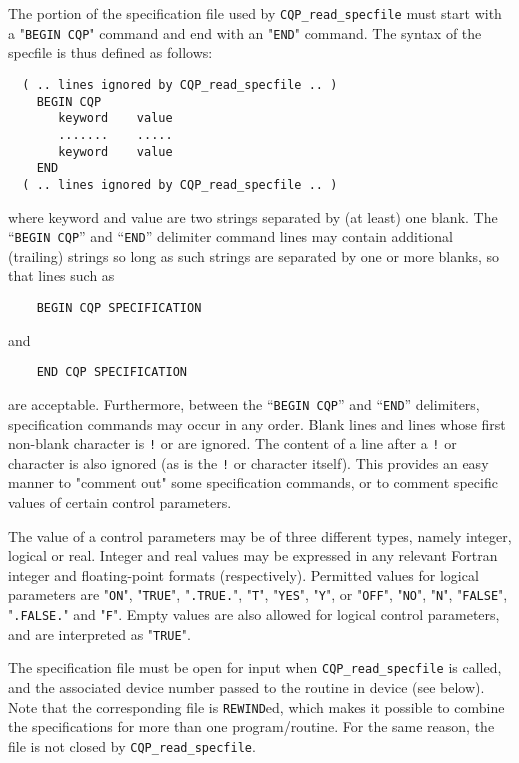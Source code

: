 \documentclass{galahad}
\newcommand{\packagename}{CQP}
\begin{document}
The portion of the specification file used by
{\tt \packagename\_read\_specfile}
must start
with a "{\tt BEGIN \packagename}" command and end with an
"{\tt END}" command.  The syntax of the specfile is thus defined as follows:
\begin{verbatim}
  ( .. lines ignored by CQP_read_specfile .. )
    BEGIN CQP
       keyword    value
       .......    .....
       keyword    value
    END
  ( .. lines ignored by CQP_read_specfile .. )
\end{verbatim}
where keyword and value are two strings separated by (at least) one blank.
The ``{\tt BEGIN \packagename}'' and ``{\tt END}'' delimiter command lines
may contain additional (trailing) strings so long as such strings are
separated by one or more blanks, so that lines such as
\begin{verbatim}
    BEGIN CQP SPECIFICATION
\end{verbatim}
and
\begin{verbatim}
    END CQP SPECIFICATION
\end{verbatim}
are acceptable. Furthermore,
between the
``{\tt BEGIN \packagename}'' and ``{\tt END}'' delimiters,
specification commands may occur in any order.  Blank lines and
lines whose first non-blank character is {\tt !} or {\tt *} are ignored.
The content
of a line after a {\tt !} or {\tt *} character is also
ignored (as is the {\tt !} or {\tt *}
character itself). This provides an easy manner to "comment out" some
specification commands, or to comment specific values
of certain control parameters.

The value of a control parameters may be of three different types, namely
integer, logical or real.
Integer and real values may be expressed in any relevant Fortran integer and
floating-point formats (respectively). Permitted values for logical
parameters are "{\tt ON}", "{\tt TRUE}", "{\tt .TRUE.}", "{\tt T}",
"{\tt YES}", "{\tt Y}", or "{\tt OFF}", "{\tt NO}",
"{\tt N}", "{\tt FALSE}", "{\tt .FALSE.}" and "{\tt F}".
Empty values are also allowed for
logical control parameters, and are interpreted as "{\tt TRUE}".

The specification file must be open for
input when {\tt \packagename\_read\_specfile}
is called, and the associated device number
passed to the routine in device (see below).
Note that the corresponding
file is {\tt REWIND}ed, which makes it possible to combine the specifications
for more than one program/routine.  For the same reason, the file is not
closed by {\tt \packagename\_read\_specfile}.
\end{document}

